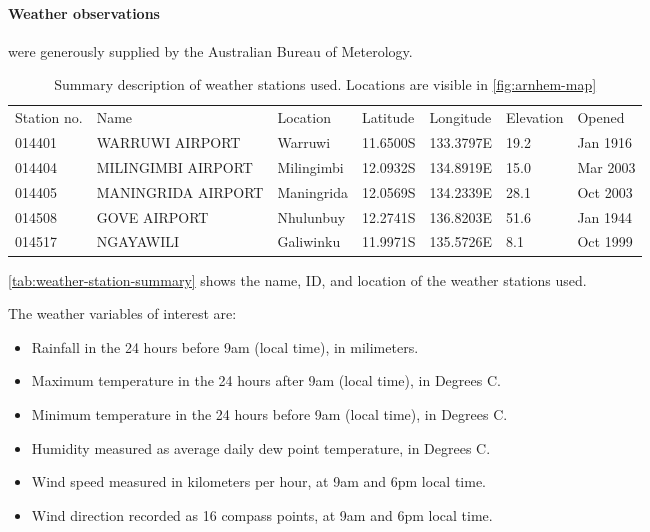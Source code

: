 \paragraph{Weather observations} were generously supplied by the
Australian Bureau of Meterology.

\begin{table}[h]
    \centering
    \begin{tabular}{lllllll}
        Station no.  &  Name                 &  Location     &  Latitude   &  Longitude   &  Elevation  &  Opened   \\
%                                                                                                      
        014401       &  WARRUWI AIRPORT      &  Warruwi      &  11.6500S   &  133.3797E   &  19.2       &  Jan 1916 \\
        014404       &  MILINGIMBI AIRPORT   &  Milingimbi   &  12.0932S   &  134.8919E   &  15.0       &  Mar 2003 \\
        014405       &  MANINGRIDA AIRPORT   &  Maningrida   &  12.0569S   &  134.2339E   &  28.1       &  Oct 2003 \\
        014508       &  GOVE AIRPORT         &  Nhulunbuy    &  12.2741S   &  136.8203E   &  51.6       &  Jan 1944 \\
        014517       &  NGAYAWILI            &  Galiwinku    &  11.9971S   &  135.5726E   &  8.1        &  Oct 1999
    \end{tabular}
    \caption{Summary description of weather stations used.
        Locations are visible in \autoref{fig:arnhem-map}}
    \label{tab:weather-station-summary}
\end{table}

\autoref{tab:weather-station-summary} shows the name, ID, and location of
the weather stations used.

The weather variables of interest are:
\begin{itemize}
\item Rainfall in the 24 hours before 9am (local time), in milimeters.
\item Maximum temperature in the 24 hours after 9am (local time), in Degrees C.
\item Minimum temperature in the 24 hours before 9am (local time), in Degrees C.
\item Humidity measured as average daily dew point temperature, in Degrees C.
\item Wind speed measured in kilometers per hour, at 9am and 6pm local time.
\item Wind direction recorded as 16 compass points, at 9am and 6pm local time.
\end{itemize}

